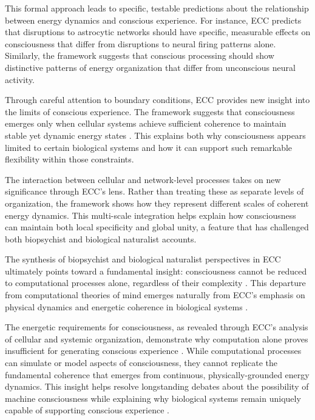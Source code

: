 This formal approach leads to specific, testable predictions about the relationship between energy dynamics and conscious experience. For instance, ECC predicts that disruptions to astrocytic networks should have specific, measurable effects on consciousness that differ from disruptions to neural firing patterns alone. Similarly, the framework suggests that conscious processing should show distinctive patterns of energy organization that differ from unconscious neural activity.

Through careful attention to boundary conditions, ECC provides new insight into the limits of conscious experience. The framework suggests that consciousness emerges only when cellular systems achieve sufficient coherence to maintain stable yet dynamic energy states \cite{maturana1991autopoiesis}. This explains both why consciousness appears limited to certain biological systems and how it can support such remarkable flexibility within those constraints.

The interaction between cellular and network-level processes takes on new significance through ECC's lens. Rather than treating these as separate levels of organization, the framework shows how they represent different scales of coherent energy dynamics. This multi-scale integration helps explain how consciousness can maintain both local specificity and global unity, a feature that has challenged both biopsychist and biological naturalist accounts.

The synthesis of biopsychist and biological naturalist perspectives in ECC ultimately points toward a fundamental insight: consciousness cannot be reduced to computational processes alone, regardless of their complexity \cite{seth2024conscious}. This departure from computational theories of mind emerges naturally from ECC's emphasis on physical dynamics and energetic coherence in biological systems \cite{thompson2010mind}.

The energetic requirements for consciousness, as revealed through ECC's analysis of cellular and systemic organization, demonstrate why computation alone proves insufficient for generating conscious experience \cite{piccinini2013neural}. While computational processes can simulate or model aspects of consciousness, they cannot replicate the fundamental coherence that emerges from continuous, physically-grounded energy dynamics. This insight helps resolve longstanding debates about the possibility of machine consciousness while explaining why biological systems remain uniquely capable of supporting conscious experience \cite{margulis2001conscious}.

